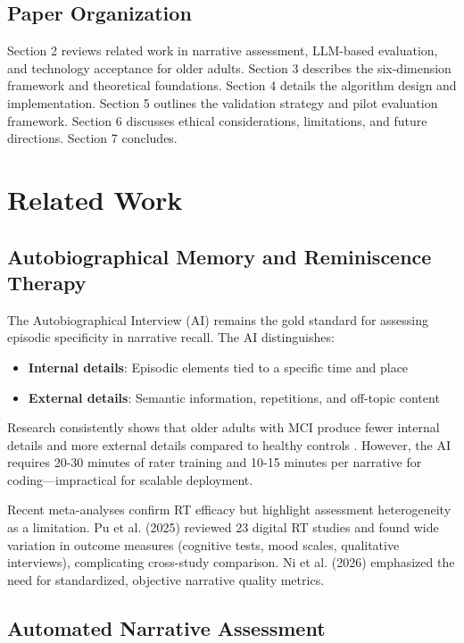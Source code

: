 \documentclass{article}
\begin{document}
\subsection{Paper Organization}

Section 2 reviews related work in narrative assessment, LLM-based evaluation, and technology acceptance for older adults. Section 3 describes the six-dimension framework and theoretical foundations. Section 4 details the algorithm design and implementation. Section 5 outlines the validation strategy and pilot evaluation framework. Section 6 discusses ethical considerations, limitations, and future directions. Section 7 concludes.

\section{Related Work}

\subsection{Autobiographical Memory and Reminiscence Therapy}

The Autobiographical Interview (AI) \cite{levine2002} remains the gold standard for assessing episodic specificity in narrative recall. The AI distinguishes:
\begin{itemize}
    \item \textbf{Internal details}: Episodic elements tied to a specific time and place
    \item \textbf{External details}: Semantic information, repetitions, and off-topic content
\end{itemize}

Research consistently shows that older adults with MCI produce fewer internal details and more external details compared to healthy controls \cite{irish2024, barnhofer2025}. However, the AI requires 20-30 minutes of rater training and 10-15 minutes per narrative for coding---impractical for scalable deployment.

Recent meta-analyses confirm RT efficacy but highlight assessment heterogeneity as a limitation. Pu et al. (2025) \cite{pu2025} reviewed 23 digital RT studies and found wide variation in outcome measures (cognitive tests, mood scales, qualitative interviews), complicating cross-study comparison. Ni et al. (2026) \cite{ni2026} emphasized the need for standardized, objective narrative quality metrics.

\subsection{Automated Narrative Assessment}
\end{document}
